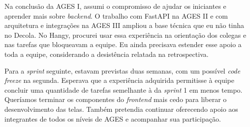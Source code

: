 Na conclusão da AGES I, assumi o compromisso de ajudar os iniciantes e
aprender mais sobre \textit{backend}. O trabalho com FastAPI na AGES II e
com arquitetura e integrações na AGES III ampliou a base técnica que eu não
tinha no Decola. No Hangy, procurei usar essa experiência na orientação dos
colegas e nas tarefas que bloqueavam a equipe. Eu ainda precisava estender
esse apoio a toda a equipe, considerando a
desistência relatada na retrospectiva.

Para a \textit{sprint} seguinte, estavam previstas duas semanas, com um
possível \textit{code freeze} na segunda. Esperava que a experiência
adquirida permitisse à equipe concluir uma quantidade de tarefas semelhante
à da \textit{sprint} 1 em menos tempo. Queríamos terminar os componentes do
\textit{frontend} mais cedo para liberar o desenvolvimento das telas.
Também pretendia continuar oferecendo apoio aos integrantes de todos os
níveis de AGES e acompanhar sua participação.
